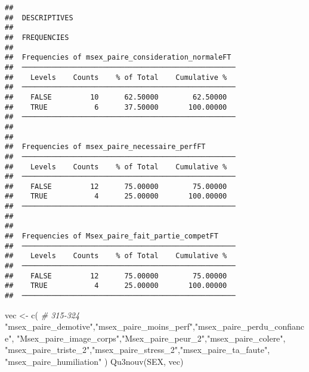 \documentclass[
]{article}
\newenvironment{Shaded}{\begin{snugshade}}{\end{snugshade}}
\newcommand{\CommentTok}[1]{\textcolor[rgb]{0.56,0.35,0.01}{\textit{#1}}}
\newcommand{\FunctionTok}[1]{\textcolor[rgb]{0.00,0.00,0.00}{#1}}
\newcommand{\NormalTok}[1]{#1}
\newcommand{\OtherTok}[1]{\textcolor[rgb]{0.56,0.35,0.01}{#1}}
\newcommand{\StringTok}[1]{\textcolor[rgb]{0.31,0.60,0.02}{#1}}
\begin{document}
\begin{verbatim}
## 
##  DESCRIPTIVES
## 
##  FREQUENCIES
## 
##  Frequencies of msex_paire_consideration_normaleFT  
##  ────────────────────────────────────────────────── 
##    Levels    Counts    % of Total    Cumulative %   
##  ────────────────────────────────────────────────── 
##    FALSE         10      62.50000        62.50000   
##    TRUE           6      37.50000       100.00000   
##  ────────────────────────────────────────────────── 
## 
## 
##  Frequencies of msex_paire_necessaire_perfFT        
##  ────────────────────────────────────────────────── 
##    Levels    Counts    % of Total    Cumulative %   
##  ────────────────────────────────────────────────── 
##    FALSE         12      75.00000        75.00000   
##    TRUE           4      25.00000       100.00000   
##  ────────────────────────────────────────────────── 
## 
## 
##  Frequencies of Msex_paire_fait_partie_competFT     
##  ────────────────────────────────────────────────── 
##    Levels    Counts    % of Total    Cumulative %   
##  ────────────────────────────────────────────────── 
##    FALSE         12      75.00000        75.00000   
##    TRUE           4      25.00000       100.00000   
##  ──────────────────────────────────────────────────
\end{verbatim}

\begin{Shaded}
\begin{Highlighting}[]
\NormalTok{vec }\OtherTok{\textless{}{-}} \FunctionTok{c}\NormalTok{(   }\CommentTok{\# 315{-}324}
  \StringTok{"msex\_paire\_demotive"}\NormalTok{,}\StringTok{"msex\_paire\_moins\_perf"}\NormalTok{,}\StringTok{"msex\_paire\_perdu\_confiance"}\NormalTok{,}
  \StringTok{"Msex\_paire\_image\_corps"}\NormalTok{,}\StringTok{"Msex\_paire\_peur\_2"}\NormalTok{,}\StringTok{"msex\_paire\_colere"}\NormalTok{,}
  \StringTok{"msex\_paire\_triste\_2"}\NormalTok{,}\StringTok{"msex\_paire\_stress\_2"}\NormalTok{,}\StringTok{"msex\_paire\_ta\_faute"}\NormalTok{,}
  \StringTok{"msex\_paire\_humiliation"}
\NormalTok{  )}
\FunctionTok{Qu3nouv}\NormalTok{(SEX, vec)}
\end{Highlighting}
\end{Shaded}
\end{document}
